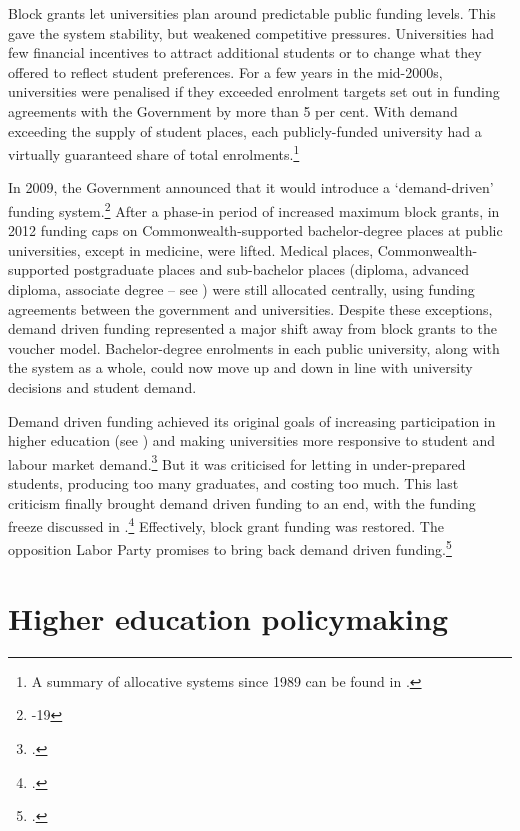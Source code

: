 \documentclass{grattan}
\begin{document}
Block grants let universities plan around predictable public funding levels. This gave the system stability, but weakened competitive pressures. Universities had few financial incentives to attract additional students or to change what they offered to reflect student preferences. For a few years in the mid-2000s, universities were penalised if they exceeded enrolment targets set out in funding agreements with the Government by more than 5 per cent. With demand exceeding the supply of student places, each publicly-funded university had a virtually guaranteed share of total enrolments.\footnote{A summary of allocative systems since 1989 can be found in \textcite[][]{GrattanInstitute2018demanddrivenfacts}.}

In 2009, the Government announced that it would introduce a `demand-driven' funding system.\footnote{\textcite[][17]{DEEWR2009transformingaustra}-19} After a phase-in period of increased maximum block grants, in 2012 funding caps on Commonwealth-supported bachelor-degree places at public universities, except in medicine, were lifted. Medical places, Commonwealth-supported postgraduate places and sub-bachelor places (diploma, advanced diploma, associate degree -- see ) were still allocated centrally, using funding agreements between the government and universities. Despite these exceptions, demand driven funding represented a major shift away from block grants to the voucher model. Bachelor-degree enrolments in each public university, along with the system as a whole, could now move up and down in line with university decisions and student demand.

Demand driven funding achieved its original goals of increasing participation in higher education (see ) and making universities more responsive to student and labour market demand.\footcites[][]{Kemp2014reviewofthedeman}[][]{Norton2017universitiesandth} But it was criticised for letting in under-prepared students, producing too many graduates, and costing too much. This last criticism finally brought demand driven funding to an end, with the funding freeze discussed in .\footcite[][]{Birmingham2017sustainabilityand} Effectively, block grant funding was restored. The opposition Labor Party promises to bring back demand driven funding.\footcite[][]{Shorten2018budgetreplyspeech}

%
\chapter{Higher education policymaking }\label{chap:higher-education-policymaking}
\end{document}
